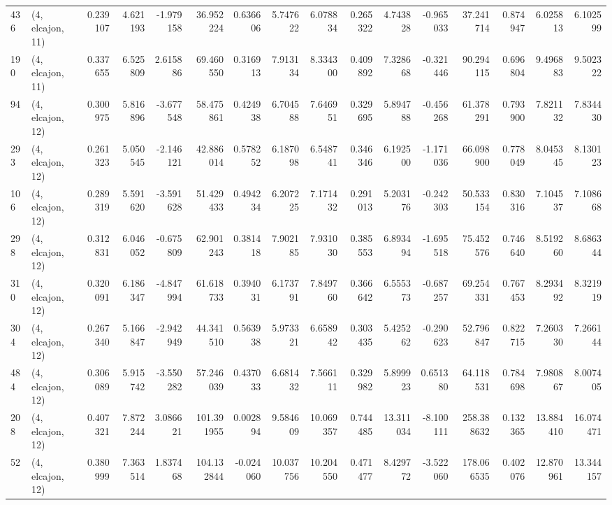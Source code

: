 \begin{tabular}{llrrrrrrrrrrrrrr}
436 &  (4, elcajon, 11) &   0.239107 &   4.621193 &  -1.979158 &    36.952224 &   0.636606 &   5.747622 &   6.078834 &  0.265322 &   4.743828 &  -0.965033 &     37.241714 &   0.874947 &   6.025813 &    6.102599 \\
190 &  (4, elcajon, 11) &   0.337655 &   6.525809 &   2.615886 &    69.460550 &   0.316913 &   7.913134 &   8.334300 &  0.409892 &   7.328668 &  -0.321446 &     90.294115 &   0.696804 &   9.496883 &    9.502322 \\
94  &  (4, elcajon, 12) &   0.300975 &   5.816896 &  -3.677548 &    58.475861 &   0.424938 &   6.704588 &   7.646951 &  0.329695 &   5.894788 &  -0.456268 &     61.378291 &   0.793900 &   7.821132 &    7.834430 \\
293 &  (4, elcajon, 12) &   0.261323 &   5.050545 &  -2.146121 &    42.886014 &   0.578252 &   6.187098 &   6.548741 &  0.346346 &   6.192500 &  -1.171036 &     66.098900 &   0.778049 &   8.045345 &    8.130123 \\
106 &  (4, elcajon, 12) &   0.289319 &   5.591620 &  -3.591628 &    51.429433 &   0.494234 &   6.207225 &   7.171432 &  0.291013 &   5.203176 &  -0.242303 &     50.533154 &   0.830316 &   7.104537 &    7.108668 \\
298 &  (4, elcajon, 12) &   0.312831 &   6.046052 &  -0.675809 &    62.901243 &   0.381418 &   7.902185 &   7.931030 &  0.385553 &   6.893494 &  -1.695518 &     75.452576 &   0.746640 &   8.519260 &    8.686344 \\
310 &  (4, elcajon, 12) &   0.320091 &   6.186347 &  -4.847994 &    61.618733 &   0.394031 &   6.173791 &   7.849760 &  0.366642 &   6.555373 &  -0.687257 &     69.254331 &   0.767453 &   8.293492 &    8.321919 \\
304 &  (4, elcajon, 12) &   0.267340 &   5.166847 &  -2.942949 &    44.341510 &   0.563938 &   5.973321 &   6.658942 &  0.303435 &   5.425262 &  -0.290623 &     52.796847 &   0.822715 &   7.260330 &    7.266144 \\
484 &  (4, elcajon, 12) &   0.306089 &   5.915742 &  -3.550282 &    57.246039 &   0.437033 &   6.681432 &   7.566111 &  0.329982 &   5.899923 &   0.651380 &     64.118531 &   0.784698 &   7.980867 &    8.007405 \\
208 &  (4, elcajon, 12) &   0.407321 &   7.872244 &   3.086621 &   101.391955 &   0.002894 &   9.584609 &  10.069357 &  0.744485 &  13.311034 &  -8.100111 &    258.388632 &   0.132365 &  13.884410 &   16.074471 \\
52  &  (4, elcajon, 12) &   0.380999 &   7.363514 &   1.837468 &   104.132844 &  -0.024060 &  10.037756 &  10.204550 &  0.471477 &   8.429772 &  -3.522060 &    178.066535 &   0.402076 &  12.870961 &   13.344157 \\

\end{tabular}
